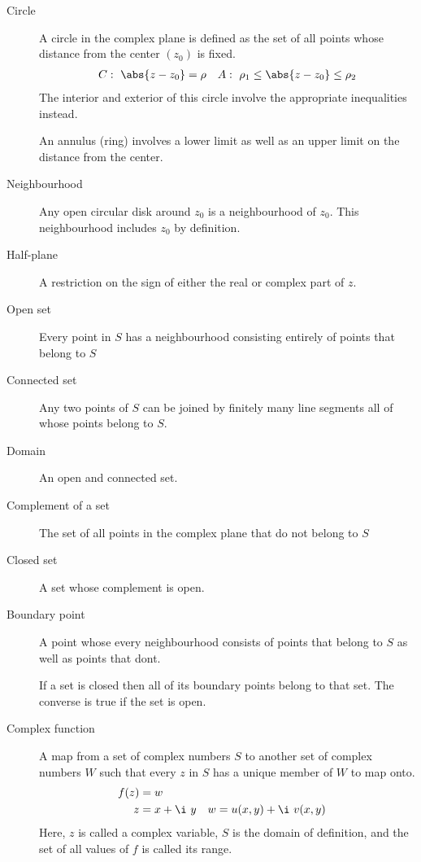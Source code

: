 \begin{description}
    \item[Circle] A circle in the complex plane is defined as the set of all points whose
        distance from the center $ (z_0) $ is fixed.
        \begin{align}
            C & :\ \abs{z - z_0} = \rho &
            A :\ \rho_1 \leq \abs{z - z_0} \leq \rho_2
        \end{align}
        The interior and exterior of this circle involve the appropriate inequalities
        instead. \par
        An annulus (ring) involves a lower limit as well as an upper limit on the
        distance from the center.

    \item[Neighbourhood] Any open circular disk around $ z_0 $ is a neighbourhood of
        $ z_0 $. This neighbourhood includes $ z_0 $ by definition.

    \item[Half-plane] A restriction on the sign of either the real or complex part of
        $ z $.

    \item[Open set] Every point in $ S $ has a neighbourhood consisting entirely of
        points that belong to $ S $
    \item[Connected set] Any two points of $ S $ can be joined by finitely many line
        segments all of whose points belong to $ S $.
    \item[Domain] An open and connected set.
    \item[Complement of a set] The set of all points in the complex plane that do not
        belong to $ S $
    \item[Closed set] A set whose complement is open.
    \item[Boundary point] A point whose every neighbourhood consists of points that
        belong to $ S $ as well as points that dont. \par
        If a set is closed then all of its boundary points belong to that set. The
        converse is true if the set is open.

    \item[Complex function] A map from a set of complex numbers $ S $ to another set of
        complex numbers $ W $ such that every $ z $ in $ S $ has a unique member of
        $ W $ to map onto.
        \begin{align}
            f(z) & = w                                       \\
            z    & = x + \i\ y & w & = u(x, y) + \i\ v(x, y)
        \end{align}
        Here, $ z $ is called a complex variable, $ S $ is the domain of definition, and
        the set of all values of $ f $ is called its range.


\end{description}
